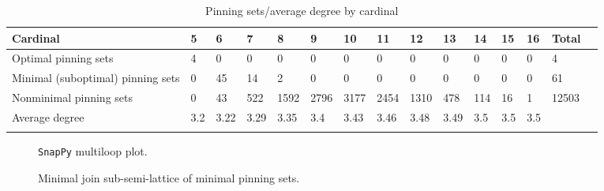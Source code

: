\documentclass{article}%
\begin{document}
\begin{table}[ht]
	\caption{Pinning sets/average degree by cardinal}
	\centering
	\renewcommand{\arraystretch}{1.5}
	\begin{tabularx}{\textwidth}{lXXXXXXXXXXXXXX}
		\toprule
			Cardinal & 5 & 6 & 7 & 8 & 9 & 10 & 11 & 12 & 13 & 14 & 15 & 16 & Total\\
			\hline
			Optimal pinning sets & 4 & 0 & 0 & 0 & 0 & 0 & 0 & 0 & 0 & 0 & 0 & 0 & 4 \\
			Minimal (suboptimal) pinning sets & 0 & 45 & 14 & 2 & 0 & 0 & 0 & 0 & 0 & 0 & 0 & 0 & 61 \\
			Nonminimal pinning sets & 0 & 43 & 522 & 1592 & 2796 & 3177 & 2454 & 1310 & 478 & 114 & 16 & 1 & 12503 \\
			Average degree & 3.2 & 3.22 & 3.29 & 3.35 & 3.4 & 3.43 & 3.46 & 3.48 & 3.49 & 3.5 & 3.5 & 3.5 &  \\
		\bottomrule \\ 
	\end{tabularx}
\end{table}

\begin{multicols}{2}
\begin{figure}[H]
\centering

\caption{\texttt{SnapPy} multiloop plot.}
\label{fig:tex/img/[[28, 7, 1, 8], [8, 19, 9, 20], [20, 27, 21, 28], [11, 6, 12, 7], [1, 18, 2, 19], [9, 26, 10, 27], [21, 10, 22, 11], [22, 5, 23, 6], [12, 17, 13, 18], [2, 13, 3, 14], [14, 25, 15, 26], [15, 4, 16, 5],.svg}
\end{figure}
\columnbreak

\begin{figure}[H]
\centering
\scalebox{0.8}{}
\caption{Minimal join sub-semi-lattice of minimal pinning sets.}
\label{fig:tex/img/[[28, 7, 1, 8], [8, 19, 9, 20], [20, 27, 21, 28], [11, 6, 12, 7], [1, 18, 2, 19], [9, 26, 10, 27], [21, 10, 22, 11], [22, 5, 23, 6], [12, 17, 13, 18], [2, 13, 3, 14], [14, 25, 15, 26], [15, 4, 16, 5],.pgf}
\end{figure}
\end{multicols}
\end{document}
